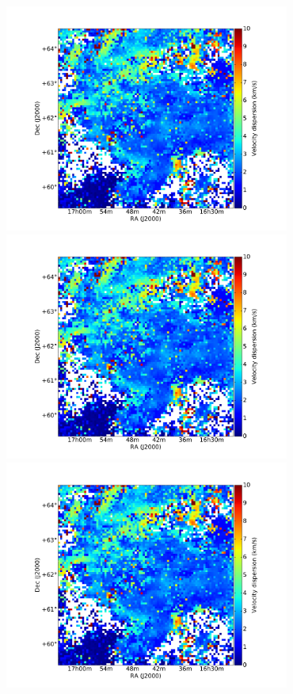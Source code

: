 \documentclass[traditabstract]{aa}
\begin{document}
\begin{figure}[h]
  \centering
  \includegraphics[page=1,height=7.5cm,trim=110 35 105 75,clip=true]{Figures/Phases_GHIGLS/GHIGLS_disp.pdf}
  \hspace{5mm}
  \includegraphics[page=4,height=7.5cm,trim=110 35 105 75,clip=true]{Figures/Phases_GHIGLS/GHIGLS_disp.pdf} \\
  \vspace{5mm}
  \includegraphics[page=2,height=7.5cm,trim=110 35 105 75,clip=true]{Figures/Phases_GHIGLS/GHIGLS_disp.pdf}

\end{figure}
\end{document}
